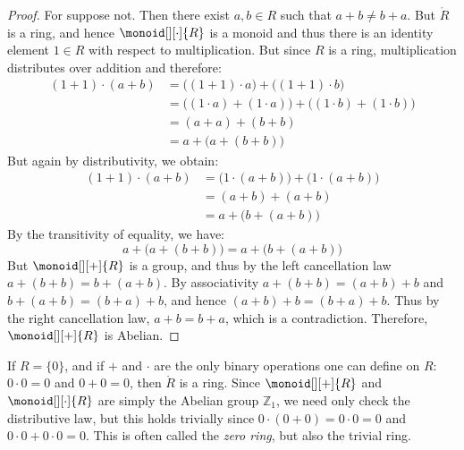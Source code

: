 \documentclass{article}                                                        %
\begin{document}
        \begin{proof}
            For suppose not. Then there exist $a,b\in{R}$ such that
            $a+b\ne{b}+a$. But $\ring{R}$ is a ring, and hence
            $\monoid[][\cdot]{R}$ is a monoid and thus there is an identity
            element $1\in{R}$ with respect to multiplication. But since $R$ is a
            ring, multiplication distributes over addition and therefore:
            \begin{align}
                (1+1)\cdot(a+b)
                    &=\big((1+1)\cdot{a}\big)+\big((1+1)\cdot{b}\big)
                    \tag{Left Distributive Law}\\
                    &=\big((1\cdot{a})+(1\cdot{a})\big)+
                        \big((1\cdot{b})+(1\cdot{b})\big)
                    \tag{Right Distributive Law}\\
                    &=(a+a)+(b+b)
                        \tag{Multiplicative Identity}\\
                    &=a+\big(a+(b+b)\big)
                        \tag{Associative Law}
            \end{align}
            But again by distributivity, we obtain:
            \begin{align}
                (1+1)\cdot(a+b)
                &=\big(1\cdot(a+b)\big)+\big(1\cdot(a+b)\big)
                \tag{Right Distributive Law}\\
                &=(a+b)+(a+b)
                    \tag{Multiplicative Identity}\\
                &=a+\big(b+(a+b)\big)
                    \tag{Associative Law}
            \end{align}
            By the transitivity of equality, we have:
            \begin{equation}
                a+\big(a+(b+b)\big)=a+\big(b+(a+b)\big)
            \end{equation}
            But $\monoid[][+]{R}$ is a group, and thus by the left cancellation
            law $a+(b+b)=b+(a+b)$. By associativity $a+(b+b)=(a+b)+b$ and
            $b+(a+b)=(b+a)+b$, and hence $(a+b)+b=(b+a)+b$. Thus by the right
            cancellation law, $a+b=b+a$, which is a contradiction. Therefore,
            $\monoid[][+]{R}$ is Abelian.
        \end{proof}
        \begin{example}
            If $R=\{0\}$, and if $+$ and $\cdot$ are the only binary operations
            one can define on $R$: $0\cdot{0}=0$ and $0+0=0$, then
            $\ring{R}$ is a ring. Since $\monoid[][+]{R}$ and
            $\monoid[][\cdot]{R}$ are simply the Abelian group $\mathbb{Z}_{1}$,
            we need only check the distributive law, but this holds trivially
            since $0\cdot(0+0)=0\cdot{0}=0$ and $0\cdot{0}+0\cdot{0}=0$. This is
            often called the \textit{zero ring}, but also the trivial ring.
        \end{example}
\end{document}

